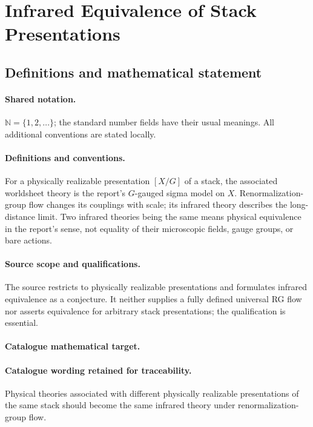 \documentclass[11pt]{article}
\begin{document}
\section{Infrared Equivalence of Stack Presentations}\label{statement}

\subsection{Definitions and mathematical statement}

\paragraph{Shared notation.}$\mathbb N=\{1,2,\ldots\}$; the standard number fields have their usual meanings. All additional conventions are stated locally.


\paragraph{Definitions and conventions.} For a physically realizable presentation $[X/G]$ of a stack, the associated worldsheet theory is the report's $G$-gauged sigma model on $X$. Renormalization-group flow changes its couplings with scale; its infrared theory describes the long-distance limit. Two infrared theories being the same means physical equivalence in the report's sense, not equality of their microscopic fields, gauge groups, or bare actions.

\paragraph{Source scope and qualifications.} The source restricts to physically realizable presentations and formulates infrared equivalence as a conjecture. It neither supplies a fully defined universal RG flow nor asserts equivalence for arbitrary stack presentations; the qualification is essential.

\paragraph{Catalogue mathematical target.}
\paragraph{Catalogue wording retained for traceability.}
Physical theories associated with different physically realizable presentations of the same stack should become the same infrared theory under renormalization-group flow.
\end{document}
